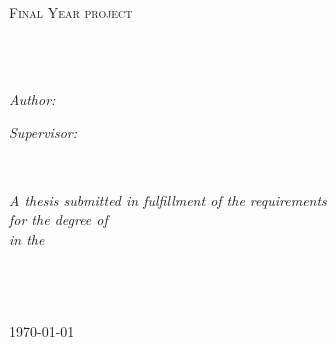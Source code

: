 \documentclass[
11pt, %
oneside, %
english, %
singlespacing, %
liststotoc, %
toctotoc, %
headsepline, %
]{MastersDoctoralThesis} %
\author{Kuichen Shao \\ Jiatai Wu} %
\begin{document}
\frontmatter %

\pagestyle{plain} %


\begin{titlepage}
\begin{center}

\vspace*{.06\textheight}
{\scshape\LARGE \univname\par}\vspace{1.5cm} %
\textsc{\Large Final Year project}\\[0.5cm] %

\HRule \\[0.4cm] %
{\huge \bfseries \ttitle\par}\vspace{0.4cm} %
\HRule \\[1.5cm] %
 
\begin{minipage}[t]{0.4\textwidth}
\begin{flushleft} \large
\emph{Author:}\\
\authorname %
\end{flushleft}
\end{minipage}
\begin{minipage}[t]{0.4\textwidth}
\begin{flushright} \large
\emph{Supervisor:} \\
\href{https://www.fst.um.edu.mo/people/liuzhi/}{\supname} %
\end{flushright}
\end{minipage}\\[3cm]
 
\vfill

\large \textit{A thesis submitted in fulfillment of the requirements\\ for the degree of \degreename}\\[0.3cm] %
\textit{in the}\\[0.4cm]
\deptname\\\facname\\\univname \\[2cm] %

\vfill

{\large \today}\\[4cm] %
 
\vfill
\end{center}
\end{titlepage}
\end{document}
